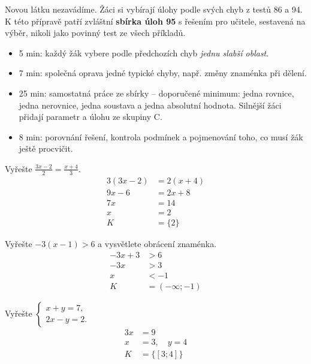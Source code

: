 \documentclass[11pt,a4paper]{article}
\begin{document}
Novou látku nezavádíme. Žáci si vybírají úlohy podle svých chyb z testů 86 a 94. K této přípravě patří zvláštní \textbf{sbírka úloh 95} s řešením pro učitele, sestavená na výběr, nikoli jako povinný test ze všech příkladů.
\begin{itemize}
\item 5 min: každý žák vybere podle předchozích chyb \emph{jednu slabší oblast}.
\item 7 min: společná oprava jedné typické chyby, např. změny znaménka při dělení.
\item 25 min: samostatná práce ze sbírky -- doporučené minimum: jedna rovnice, jedna nerovnice, jedna soustava a jedna absolutní hodnota. Silnější žáci přidají parametr a úlohu ze skupiny C.
\item 8 min: porovnání řešení, kontrola podmínek a pojmenování toho, co musí žák ještě procvičit.
\end{itemize}
\begin{prikladReseniBox}[title={Příklad 1}]
Vyřešte $\frac{3x-2}{2}=\frac{x+4}{3}$.
\tcblower
\[\begin{aligned}
3(3x-2)&=2(x+4) \\
9x-6&=2x+8 \\
7x&=14 \\
x&=2 \\
K&=\{2\}
\end{aligned}\]

\end{prikladReseniBox}
\begin{prikladReseniBox}[title={Příklad 2}]
Vyřešte $-3(x-1)>6$ a vysvětlete obrácení znaménka.
\tcblower
\[\begin{aligned}
-3x+3&>6 \\
-3x&>3 \\
x&<-1 \\
K&=(-\infty;-1)
\end{aligned}\]

\end{prikladReseniBox}
\begin{zadaniReseniBox}[title={Samostatná práce 1}]
Vyřešte $\begin{cases}x+y=7,\\2x-y=2.\end{cases}$
\tcblower
\[\begin{aligned}
3x&=9 \\
x&=3,\quad y=4 \\
K&=\{[3;4]\}
\end{aligned}\]

\end{zadaniReseniBox}
\end{document}
